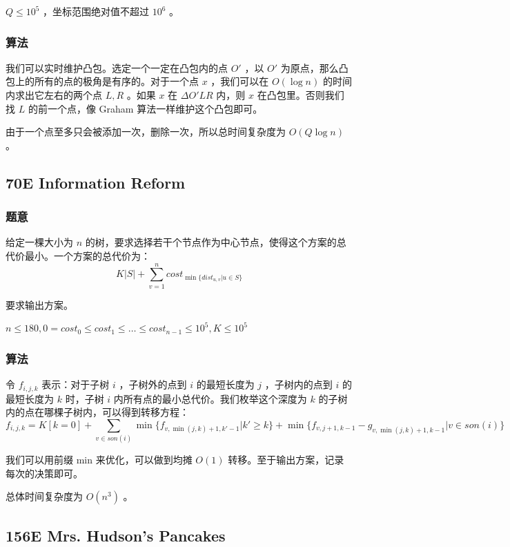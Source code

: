 \documentclass[11pt]{article}
\begin{document}
   $Q \leq 10^5$ ，坐标范围绝对值不超过 $10^6$ 。
\subsubsection{算法}
\label{sec-5-1-2}

    我们可以实时维护凸包。选定一个一定在凸包内的点 $O'$ ，以 $O'$ 为原点，那么凸包上的所有的点的极角是有序的。对于一个点 $x$ ，我们可以在 $O(\log n)$ 的时间内求出它左右的两个点 $L, R$ 。如果 $x$ 在 $\Delta O'LR$ 内，则 $x$ 在凸包里。否则我们找 $L$ 的前一个点，像 Graham 算法一样维护这个凸包即可。

    由于一个点至多只会被添加一次，删除一次，所以总时间复杂度为 $O(Q\log n)$ 。
\subsection{70E   Information Reform}
\label{sec-5-2}
\subsubsection{题意}
\label{sec-5-2-1}

    给定一棵大小为 $n$ 的树，要求选择若干个节点作为中心节点，使得这个方案的总代价最小。一个方案的总代价为：
    $$K|S| + \sum_{v = 1}^n cost_{\min \{dist_{u, v} \vert u \in S \}}$$

    要求输出方案。

    $n \leq 180, 0 = cost_0 \leq cost_1 \leq \dots \leq cost_{n - 1} \leq 10^5, K \leq 10^5$
\subsubsection{算法}
\label{sec-5-2-2}

    令 $f_{i, j, k}$ 表示：对于子树 $i$ ，子树外的点到 $i$ 的最短长度为 $j$ ，子树内的点到 $i$ 的最短长度为 $k$ 时，子树 $i$ 内所有点的最小总代价。我们枚举这个深度为 $k$ 的子树内的点在哪棵子树内，可以得到转移方程：
    $$f_{i, j, k} = K [k = 0] + \sum_{v \in son(i)} \min \{f_{v, \min (j, k) + 1, k' - 1} \vert k' \geq k\} + \min \{f_{v, j + 1, k - 1} - g_{v, \min (j, k) + 1, k - 1} \vert v \in son (i)\}$$

    我们可以用前缀 min 来优化，可以做到均摊 $O(1)$ 转移。至于输出方案，记录每次的决策即可。

    总体时间复杂度为 $O(n^3)$ 。
\subsection{156E  Mrs. Hudson's Pancakes}
\label{sec-5-3}
\end{document}
